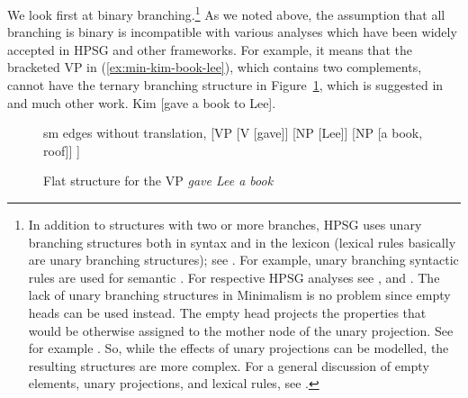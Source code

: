 \documentclass[output=paper
 	        ,biblatex
                ,babelshorthands
                ,newtxmath
                ,draftmode
                ,colorlinks, citecolor=brown
]{langscibook}
\begin{document}
We look first at binary branching.\footnote{
  In addition to structures with two or more branches, HPSG uses unary branching structures both in syntax
  and in the lexicon (lexical rules basically are unary branching structures); see
  .
  For example, unary branching syntactic rules are used for semantic 
  \citep{Partee87a-u}. For respective HPSG analyses see ,
   and . The lack of unary branching structures in Minimalism is
  no problem since empty heads can be used instead. The empty head projects the
  properties that would be otherwise assigned to the mother node of the unary projection. See for
  example . So, while the effects of unary projections can be
  modelled, the resulting structures are more complex. For a general discussion of empty elements,
  unary projections, and lexical rules, see .
% 
} As we noted above, the assumption that all branching is binary is incompatible with various
analyses which have been widely accepted in HPSG and other frameworks. For example, it means that
the bracketed VP in (\ref{ex:min-kim-book-lee}), which contains two complements, cannot have the
ternary branching structure in Figure~\ref{fig:gave-lee-book}, which is suggested in  and much other work.
\ea
Kim [gave a book to Lee].\label{ex:min-kim-book-lee}
\z
\begin{figure}
	\centering
	\begin{forest} sm edges without translation, 
		[VP
		[V [gave]] [NP [Lee]] [NP [a book, roof]]
		]
	\end{forest}
	\caption{\label{fig:gave-lee-book}Flat structure for the VP \emph{gave Lee a book}}
\end{figure}
\end{document}
